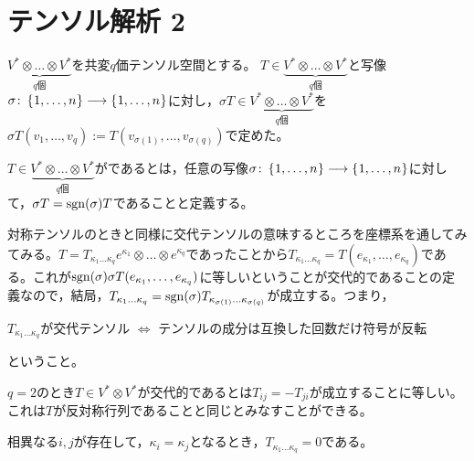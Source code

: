 \documentclass[uplatex]{jsarticle}
\begin{document}
\fi

\section{テンソル解析 2}
\par
$\underbrace{V^{*} \otimes \dots \otimes V^{*}}_{q\text{個}}$を共変$q$価テンソル空間とする。
$T \in \underbrace{V^{*} \otimes \dots \otimes V^{*}}_{q\text{個}}$と写像$\sigma \colon \Set{\hspace{-1.8pt} 1,\dots,n \hspace{-1.8pt}} \longrightarrow \Set{\hspace{-1.8pt} 1,\dots,n \hspace{-1.8pt}}$に対し，$\sigma T \in \underbrace{V^{*} \otimes \dots \otimes V^{*}}_{q\text{個}}$を$\sigma T (v_{1}, \dots, v_{q}) := T(v_{\sigma(1)},\dots, v_{\sigma(q)})$で定めた。

\begin{teigi}[交代テンソル]
  $T \in \underbrace{V^{*} \otimes \dots \otimes V^{*}}_{q\text{個}}$がであるとは，任意の写像$\sigma \colon \Set{\hspace{-1.8pt} 1,\dots,n \hspace{-1.8pt}} \longrightarrow \Set{\hspace{-1.8pt} 1,\dots,n \hspace{-1.8pt}}$に対して，$\sigma T = \operatorname{sgn} (\sigma) T$であることと定義する。
\end{teigi}

対称テンソルのときと同様に交代テンソルの意味するところを座標系を通してみてみる。$T = T_{\kappa_{1} \dots \kappa_{q}} e^{\kappa_{1}} \otimes \dots \otimes e^{\kappa_{q}}$であったことから$T_{\kappa_{1} \dots \kappa_{q}} = T(e_{\kappa_{1}}, \dots, e_{\kappa_{q}})$である。これが$\operatorname{sgn} (\sigma) \sigma T (e_{\kappa_{1}}, \dots, e_{\kappa_{q}})$に等しいということが交代的であることの定義なので，結局，$T_{\kappa_{1} \dots \kappa_{q}} = \operatorname{sgn}(\sigma) T_{\kappa_{\sigma(1)}\dots \kappa_{\sigma(q)}}$が成立する。つまり，
\begin{center}
  $T_{\kappa_{1}\dots\kappa_{q}}$が交代テンソル $\iff$ テンソルの成分は互換した回数だけ符号が反転
\end{center}
ということ。

\begin{rei}
  $q = 2$のとき$T \in V^{*} \otimes V^{*}$が交代的であるとは$T_{ij} = -T_{ji}$が成立することに等しい。これは$T$が反対称行列であることと同じとみなすことができる。
\end{rei}

\begin{remark}
  相異なる$i,j$が存在して，$\kappa_{i} = \kappa_{j}$となるとき，$T_{\kappa_{1}\dots\kappa_{q}} = 0$である。
\end{remark}
\end{document}
